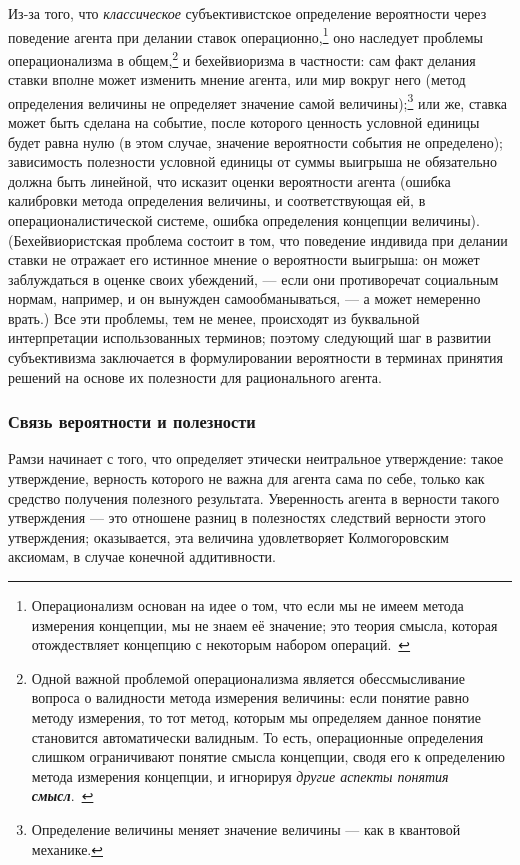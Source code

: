 \documentclass[14pt]{extarticle}
\begin{document}
Из-за того, что \emph{классическое} субъективистское определение вероятности через поведение агента при делании ставок операционно,\footnote{
	Операционализм основан на идее о том, что если мы не имеем метода измерения концепции, мы не знаем её значение; это теория смысла, которая отождествляет концепцию с некоторым набором операций.~\cite{Operationalism}
}
оно наследует проблемы операционализма в общем,\footnote{
	Одной важной проблемой операционализма является обессмысливание вопроса о валидности метода измерения величины: если понятие равно методу измерения, то тот метод, которым мы определяем данное понятие становится автоматически валидным. То есть, операционные определения слишком ограничивают понятие смысла концепции, сводя его к определению метода измерения концепции, и игнорируя \emph{другие аспекты понятия \textbf{смысл}}.~\cite{Operationalism}
}
и бехейвиоризма в частности: сам факт делания ставки вполне может изменить мнение агента, или мир вокруг него (метод определения величины не определяет значение самой величины);\footnote{
	Определение величины меняет значение величины --- как в квантовой механике.
} или же, ставка может быть сделана на событие, после которого ценность условной единицы будет равна нулю (в этом случае, значение вероятности события не определено); зависимость полезности условной единицы от суммы выигрыша не обязательно должна быть линейной, что исказит оценки вероятности агента (ошибка калибровки метода определения величины, и соответствующая ей, в операционалистической системе, ошибка определения концепции величины). (Бехейвиористская проблема состоит в том, что поведение индивида при делании ставки не отражает его истинное мнение о вероятности выигрыша: он может заблуждаться в оценке своих убеждений, --- если они противоречат социальным нормам, например, и он вынужден самообманываться, --- а может немеренно врать.) Все эти проблемы, тем не менее, происходят из буквальной интерпретации использованных терминов; поэтому следующий шаг в развитии субъективизма заключается в формулировании вероятности в терминах принятия решений на основе их полезности для рационального агента.

\subsubsection{Связь вероятности и полезности}

Рамзи начинает с того, что определяет этически неитральное утверждение: такое утверждение, верность которого не важна для агента сама по себе, только как средство получения полезного результата. Уверенность агента в верности такого утверждения --- это отношене разниц в полезностях следствий верности этого утверждения; оказывается, эта величина удовлетворяет Колмогоровским аксиомам, в случае конечной аддитивности. 
\end{document}
